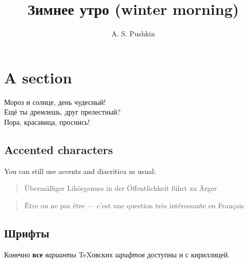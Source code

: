 \documentclass[a4paper,12pt]{article}
\author{A. S. Pushkin}
\title{Зимнее утро (winter morning)}
\begin{document}
\maketitle

\section{A section}

\noindent
Мороз и солнце, день чудесный!\\
Ещё ты дремлешь, друг прелестный?\\
Пора, красавица, проснись!

\subsection{Accented characters}
You can still use accents and diacritica as usual:
\begin{quote}
  Übermäßiger Likörgenuss in der Öffentlichkeit führt
  zu Ärger 
\end{quote}
\begin{quote}
  Être ou ne pas être --- c'est une question très intéressante
  en Français
\end{quote}

\subsection{Шрифты}
{\sc Конечно} {\bf все} {\em варианты} {\TeX}овских {\sl шрифтов}
доступны и с {\sf кириллицей}.
\end{document}
